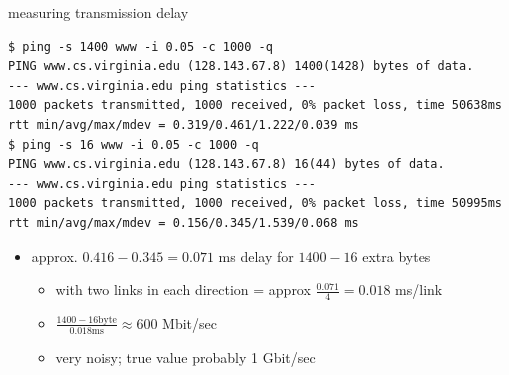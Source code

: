 \begin{frame}[fragile]{measuring transmission delay}
\begin{Verbatim}[fontsize=\fontsize{10}{11}]
$ ping -s 1400 www -i 0.05 -c 1000 -q
PING www.cs.virginia.edu (128.143.67.8) 1400(1428) bytes of data.
--- www.cs.virginia.edu ping statistics ---
1000 packets transmitted, 1000 received, 0% packet loss, time 50638ms
rtt min/avg/max/mdev = 0.319/0.461/1.222/0.039 ms
$ ping -s 16 www -i 0.05 -c 1000 -q
PING www.cs.virginia.edu (128.143.67.8) 16(44) bytes of data.
--- www.cs.virginia.edu ping statistics ---
1000 packets transmitted, 1000 received, 0% packet loss, time 50995ms
rtt min/avg/max/mdev = 0.156/0.345/1.539/0.068 ms
\end{Verbatim}
\begin{itemize}
\item approx. $0.416 - 0.345 = 0.071$ ms delay for $1400-16$ extra bytes
    \begin{itemize}
    \item with two links in each direction = approx $\frac{0.071}{4}=0.018$ ms/link
    \item $\frac{1400-16 \text{byte}}{0.018 \text{ms}} \approx 600$ Mbit/sec
    \item very noisy; true value probably 1 Gbit/sec
    \end{itemize}
\end{itemize}
\end{frame}

